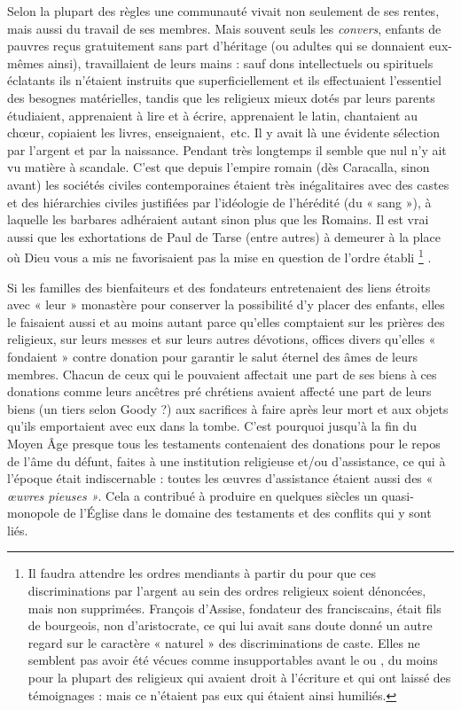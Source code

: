  Selon la plupart des règles une communauté vivait non seulement de ses rentes, mais aussi du travail de ses membres. Mais souvent seuls les \emph{convers}, enfants de pauvres reçus gratuitement sans part d'héritage (ou adultes qui se donnaient eux-mêmes ainsi), travaillaient de leurs mains : sauf dons intellectuels ou spirituels éclatants ils n'étaient instruits que superficiellement et ils effectuaient l'essentiel des besognes matérielles, tandis que les religieux mieux dotés par leurs parents étudiaient, apprenaient à lire et à écrire, apprenaient le latin, chantaient au chœur, copiaient les livres, enseignaient,~etc. Il y avait là une évidente sélection par l'argent et par la naissance. Pendant très longtemps il semble que nul n'y ait vu matière à scandale. C'est que depuis l'empire romain (dès Caracalla, sinon avant) les sociétés civiles contemporaines étaient très inégalitaires avec des castes et des hiérarchies civiles justifiées par l'idéologie de l'hérédité (du « sang »), à laquelle les barbares adhéraient autant sinon plus que les Romains. Il est vrai aussi que les exhortations de Paul de Tarse (entre autres) à demeurer à la place où Dieu vous a mis ne favorisaient pas la mise en question de l'ordre établi%
\footnote{Il faudra attendre les ordres mendiants à partir du  pour que ces discriminations par l'argent au sein des ordres religieux soient dénoncées, mais non supprimées. François d'Assise, fondateur des franciscains, était fils de bourgeois, non d'aristocrate, ce qui lui avait sans doute donné un autre regard sur le caractère « naturel » des discriminations de caste. Elles ne semblent pas avoir été vécues comme insupportables avant le  ou , du moins pour la plupart des religieux qui avaient droit à l'écriture et qui ont laissé des témoignages : mais ce n'étaient pas eux qui étaient ainsi humiliés.}%
. 

 Si les familles des bienfaiteurs et des fondateurs entretenaient des liens étroits avec « leur » monastère pour conserver la possibilité d'y placer des enfants, elles le faisaient aussi et au moins autant parce qu'elles comptaient sur les prières des religieux, sur leurs messes et sur leurs autres dévotions, offices divers qu'elles « fondaient » contre donation pour garantir le salut éternel des âmes de leurs membres. Chacun de ceux qui le pouvaient affectait une part de ses biens à ces donations comme leurs ancêtres pré chrétiens avaient affecté une part de leurs biens (un tiers selon Goody ?) aux sacrifices à faire après leur mort et aux objets qu'ils emportaient avec eux dans la tombe. C'est pourquoi jusqu'à la fin du Moyen Âge presque tous les testaments contenaient des donations pour le repos de l'âme du défunt, faites à une institution religieuse et/ou d'assistance, ce qui à l'époque était indiscernable : toutes les œuvres d'assistance étaient aussi des « \emph{œuvres pieuses »}. Cela a contribué à produire en quelques siècles un quasi-monopole de l'Église dans le domaine des testaments et des conflits qui y sont liés.
 
